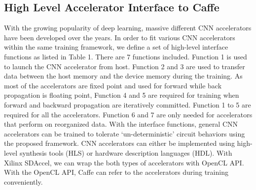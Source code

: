 \subsection{High Level Accelerator Interface to Caffe }
  With the growing popularity of deep learning, massive different 
CNN accelerators have been developed over the years. In order to fit various CNN accelerators 
within the same training framework, we define a set of high-level interface functions as listed 
in Table 1. There are 7 functions included. Function 1 is used to launch the CNN accelerator from host. 
Function 2 and 3 are used to transfer data between the host memory and the device memory during 
the training. As most of the accelerators are fixed point and used for forward while back propagation 
is floating point, Function 4 and 5 are required for training when forward and backward 
propagation are iteratively committed. Function 1 to 5 are required for all the accelerators. 
Function 6 and 7 are only needed for accelerators that perform on reorganized data\cite{pipecnn_2,deepburing_12}. 
With the interface functions, general CNN accelerators can be trained to tolerate ‘un-deterministic’ circuit 
behaviors using the proposed framework.
  CNN accelerators can either be implemented using high-level synthesis tools (HLS) or hardware description 
languages (HDL). With Xilinx SDAccel, we can wrap the both types of accelerators with OpenCL API. 
With the OpenCL API, Caffe can refer to the accelerators during training conveniently. 

